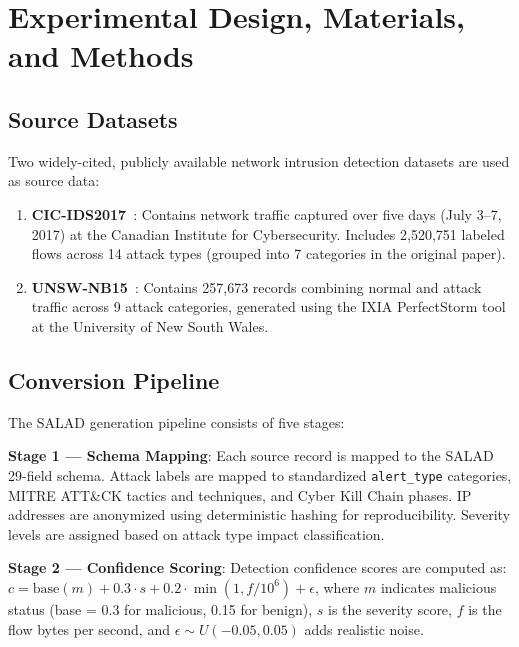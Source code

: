 \documentclass[review]{elsarticle}
\begin{document}
\section{Experimental Design, Materials, and Methods}

\subsection{Source Datasets}

Two widely-cited, publicly available network intrusion detection datasets are used as source data:

\begin{enumerate}
\item \textbf{CIC-IDS2017}~\cite{sharafaldin2018}: Contains network traffic captured over five days (July 3--7, 2017) at the Canadian Institute for Cybersecurity. Includes 2,520,751 labeled flows across 14 attack types (grouped into 7 categories in the original paper).

\item \textbf{UNSW-NB15}~\cite{moustafa2015}: Contains 257,673 records combining normal and attack traffic across 9 attack categories, generated using the IXIA PerfectStorm tool at the University of New South Wales.
\end{enumerate}


\subsection{Conversion Pipeline}

The SALAD generation pipeline consists of five stages:

\textbf{Stage 1 --- Schema Mapping}: Each source record is mapped to the SALAD 29-field schema. Attack labels are mapped to standardized \texttt{alert\_type} categories, MITRE ATT\&CK tactics and techniques, and Cyber Kill Chain phases. IP addresses are anonymized using deterministic hashing for reproducibility. Severity levels are assigned based on attack type impact classification.

\textbf{Stage 2 --- Confidence Scoring}: Detection confidence scores are computed as: $c = \text{base}(m) + 0.3 \cdot s + 0.2 \cdot \min(1, f/10^6) + \epsilon$, where $m$ indicates malicious status (base = 0.3 for malicious, 0.15 for benign), $s$ is the severity score, $f$ is the flow bytes per second, and $\epsilon \sim U(-0.05, 0.05)$ adds realistic noise.
\end{document}

